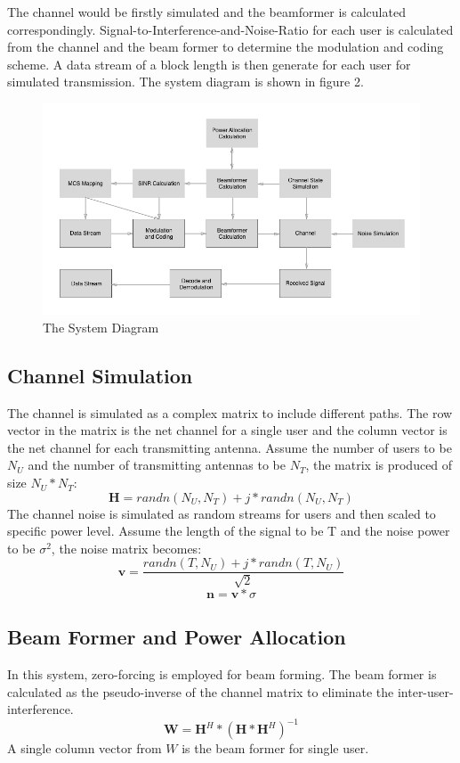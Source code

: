 \documentclass{article}
\begin{document}
The channel would be firstly simulated and the beamformer is calculated correspondingly.
Signal-to-Interference-and-Noise-Ratio for each user is calculated from the channel and the beam former to determine the modulation and coding scheme.
A data stream of a block length is then generate for each user for simulated transmission.
The system diagram is shown in figure 2.
\begin{figure}[ht]
\centering
\includegraphics[scale=0.35]{SystemDia.png}
\caption{The System Diagram}
\label{fig:SystemDia}
\end{figure}
\subsection{Channel Simulation}
The channel is simulated as a complex matrix to include different paths.
The row vector in the matrix is the net channel for a single user and the column vector is the net channel for each transmitting antenna.
Assume the number of users to be $N_U$ and the number of transmitting antennas to be $N_T$, the matrix is produced of size $N_U * N_T$:
$$ \textbf{H} = randn(N_U,N_T) + j*randn(N_U,N_T)$$
The channel noise is simulated as random streams for users and then scaled to specific power level.
Assume the length of the signal to be T and the noise power to be $\sigma^2$, the noise matrix becomes:
$$
\textbf{v} = \frac{randn(T,N_U)+j*randn(T,N_U)}{\sqrt2}
$$
$$
\textbf{n} = \textbf{v}*\sigma
$$
\subsection{Beam Former and Power Allocation}
In this system, zero-forcing is employed for beam forming.
The beam former is calculated as the pseudo-inverse of the channel matrix to eliminate the inter-user-interference.
$$
\textbf{W} = \textbf{H}^H*(\textbf{H}*\textbf{H}^H)^{-1}
$$
A single column vector from $W$ is the beam former for single user.
\end{document}
